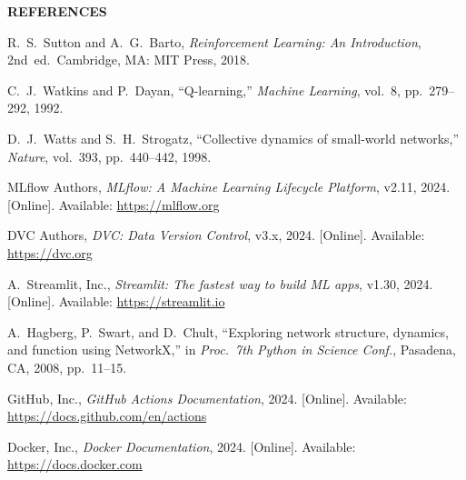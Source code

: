 \documentclass[12pt,a4paper]{report}
\begin{document}
\newpage
\begin{center}
  \textbf{\fontsize{14}{18}\selectfont REFERENCES}
\end{center}
\vspace{0.4cm}

\begin{enumerate}[leftmargin=1.5em, label={[\arabic*]}]

  \item R.~S.~Sutton and A.~G.~Barto,
        \textit{Reinforcement Learning: An Introduction},
        2nd~ed.\ Cambridge, MA: MIT Press, 2018.

  \item C.~J.~Watkins and P.~Dayan,
        ``Q-learning,''
        \textit{Machine Learning}, vol.~8, pp.~279--292, 1992.

  \item D.~J.~Watts and S.~H.~Strogatz,
        ``Collective dynamics of small-world networks,''
        \textit{Nature}, vol.~393, pp.~440--442, 1998.

  \item MLflow Authors,
        \textit{MLflow: A Machine Learning Lifecycle Platform},
        v2.11, 2024.  [Online].
        Available: \url{https://mlflow.org}

  \item DVC Authors,
        \textit{DVC: Data Version Control},
        v3.x, 2024.  [Online].
        Available: \url{https://dvc.org}

  \item A.~Streamlit, Inc.,
        \textit{Streamlit: The fastest way to build ML apps},
        v1.30, 2024.  [Online].
        Available: \url{https://streamlit.io}

  \item A.~Hagberg, P.~Swart, and D.~Chult,
        ``Exploring network structure, dynamics, and function using
        NetworkX,'' in \textit{Proc.\ 7th Python in Science Conf.},
        Pasadena, CA, 2008, pp.~11--15.

  \item GitHub, Inc.,
        \textit{GitHub Actions Documentation},
        2024.  [Online].
        Available: \url{https://docs.github.com/en/actions}

  \item Docker, Inc.,
        \textit{Docker Documentation},
        2024.  [Online].
        Available: \url{https://docs.docker.com}


\end{enumerate}
\end{document}
